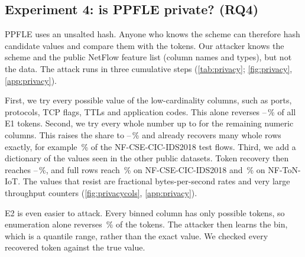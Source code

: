 \subsection{Experiment 4: is PPFLE private? (RQ4)}\label{sec:privacy}
\begin{table}[!tbp]
  \centering
  \caption{Dictionary attack on the NetFlow test splits: share of tokens and of whole rows recovered (cumulative
    levels).}
  \label{tab:privacy}
\end{table}
PPFLE uses an unsalted hash. Anyone who knows the scheme can therefore hash candidate values and compare them with
the tokens. Our attacker knows the scheme and the public NetFlow feature list (column names and types), but not the
data. The attack runs in three cumulative steps (\cref{tab:privacy}; \cref{fig:privacy}, \cref{app:privacy}).

First, we try every possible value of the  low-cardinality columns, such as ports,
protocols, TCP flags, TTLs and application codes. This alone reverses
--\,\% of all E1
tokens. Second, we try every whole number up to  for the remaining numeric columns. This
raises the share to
--\,\% and already
recovers many whole rows exactly, for example \,\% of
the NF-CSE-CIC-IDS2018 test flows. Third, we add a dictionary of the values seen in the other public datasets. Token
recovery then reaches --\,\%,
and full rows reach \,\% on NF-CSE-CIC-IDS2018 and
\,\% on NF-ToN-IoT. The values that resist are fractional
bytes-per-second rates and very large throughput counters (\cref{fig:privacycols}, \cref{app:privacy}).

E2 is even easier to attack. Every binned column has only  possible tokens, so
enumeration alone reverses \,\% of the tokens. The attacker then
learns the bin, which is a quantile range, rather than the exact value. We checked every recovered token against the
true value.

